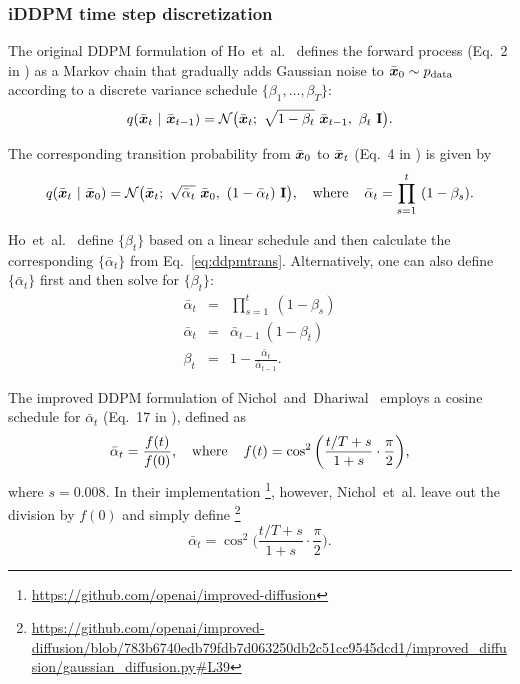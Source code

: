 \subsubsection{iDDPM time step discretization}

The original DDPM formulation of Ho~et~al.~\cite{Ho2020} defines the forward process (Eq.~2 in \cite{Ho2020}) as a Markov chain that gradually adds Gaussian noise to $\bar{\boldsymbol{x}}_0 \sim p_\text{data}$ according to a discrete variance schedule $\{\beta_1, \dots, \beta_T\}$:
\begin{equation}
  q(\bar{\boldsymbol{x}}_t ~|~ \bar{\boldsymbol{x}}_{t-1}) = \mathcal{N}\big( \bar{\boldsymbol{x}}_t; ~\sqrt{1 - \beta_t} ~\bar{\boldsymbol{x}}_{t-1}, ~\beta_t ~\mathbf{I} \big)
  \text{.}
\end{equation}

The corresponding transition probability from $\bar{\boldsymbol{x}}_0$ to $\bar{\boldsymbol{x}}_t$ (Eq.~4 in \cite{Ho2020}) is given by
\begin{equation}
  \label{eq:ddpmtrans}
  q(\bar{\boldsymbol{x}}_t ~|~ \bar{\boldsymbol{x}}_0) = \mathcal{N}\big( \bar{\boldsymbol{x}}_t; ~\sqrt{\bar\alpha_t} ~\bar{\boldsymbol{x}}_0, ~(1 - \bar\alpha_t) ~\mathbf{I} \big)
  \text{,}\hspace{4mm}\text{where}\hspace{4mm}
  \bar\alpha_t = \prod_{s=1}^t ~(1 - \beta_s)
  \text{.}
\end{equation}

Ho~et~al.~\cite{Ho2020} define $\{\beta_t\}$ based on a linear schedule and then calculate the corresponding $\{\bar\alpha_t\}$ from Eq.~\ref{eq:ddpmtrans}.
Alternatively, one can also define $\{\bar\alpha_t\}$ first and then solve for $\{\beta_t\}$:
\begin{eqnarray}
  \label{eq:ddpmbeta}
  \bar\alpha_t &=& \prod_{s=1}^t ~(1 - \beta_s) \\
  \bar\alpha_t &=& \bar\alpha_{t-1} ~(1 - \beta_t) \\
  \beta_t &=& 1 - \frac{\bar\alpha_t}{\bar\alpha_{t-1}}
  \text{.}
\end{eqnarray}

The improved DDPM formulation of Nichol~and~Dhariwal~\cite{Nichol2021a} employs a cosine schedule for $\bar\alpha_t$ (Eq.~17 in \cite{Nichol2021a}), defined as
\begin{equation}
  \bar\alpha_t = \frac{f(t)}{f(0)}
  \text{,}\hspace{4mm}\text{where}\hspace{4mm}
  f(t) = \cos^2 \bigg( \frac{t/T + s}{1 + s} \cdot \frac{\pi}{2} \bigg)
  \text{,}
\end{equation}
where $s = 0.008$.
In their implementation%
\footnote{\small\url{https://github.com/openai/improved-diffusion}},
however, Nichol~et~al. leave out the division by $f(0)$ and simply define%
\footnote{\tiny\url{https://github.com/openai/improved-diffusion/blob/783b6740edb79fdb7d063250db2c51cc9545dcd1/improved_diffusion/gaussian_diffusion.py\#L39}}
\begin{equation}
  \label{eq:ddpmalpha}
  \bar\alpha_t = \cos^2 \bigg( \frac{t/T + s}{1 + s} \cdot \frac{\pi}{2} \bigg)
  \text{.}
\end{equation}

